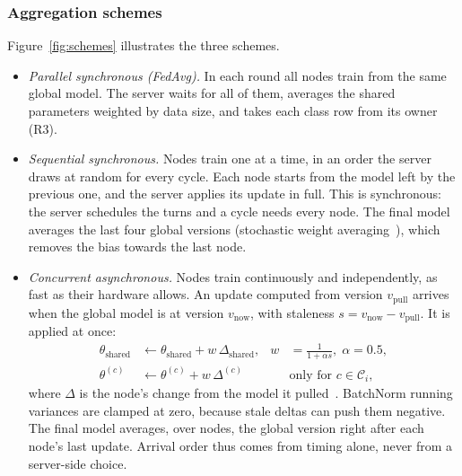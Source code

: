 \documentclass[pdflatex,sn-mathphys-num]{sn-jnl}
\begin{document}
\subsubsection{Aggregation schemes}
Figure~\ref{fig:schemes} illustrates the three schemes.
\begin{itemize}
\item \emph{Parallel synchronous (FedAvg).} In each round all nodes train from the same global model. The server waits for all of them, averages the shared parameters weighted by data size, and takes each class row from its owner (R3).
\item \emph{Sequential synchronous.} Nodes train one at a time, in an order the server draws at random for every cycle. Each node starts from the model left by the previous one, and the server applies its update in full. This is synchronous: the server schedules the turns and a cycle needs every node. The final model averages the last four global versions (stochastic weight averaging~\cite{izmailov2018swa}), which removes the bias towards the last node.
\item \emph{Concurrent asynchronous.} Nodes train continuously and independently, as fast as their hardware allows. An update computed from version $v_{\text{pull}}$ arrives when the global model is at version $v_{\text{now}}$, with staleness $s=v_{\text{now}}-v_{\text{pull}}$. It is applied at once:
\begin{align}
\theta_{\text{shared}} &\leftarrow \theta_{\text{shared}} + w\,\Delta_{\text{shared}}, & w &= \frac{1}{1+\alpha s},\;\alpha=0.5,\\
\theta^{(c)} &\leftarrow \theta^{(c)} + w\,\Delta^{(c)} &&\text{only for } c\in\mathcal{C}_i,
\end{align}
where $\Delta$ is the node's change from the model it pulled~\cite{xie2019fedasync}. BatchNorm running variances are clamped at zero, because stale deltas can push them negative. The final model averages, over nodes, the global version right after each node's last update. Arrival order thus comes from timing alone, never from a server-side choice.
\end{itemize}
\end{document}
